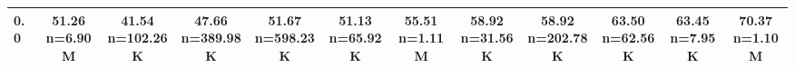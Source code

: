 \begin{table}
\begin{tabular}{lccccccccccc}
0.0 & \makecell{51.26 \\ \scriptsize n=6.90M} & \makecell{41.54 \\ \scriptsize n=102.26K} & \makecell{47.66 \\ \scriptsize n=389.98K} & \makecell{51.67 \\ \scriptsize n=598.23K} & \makecell{51.13 \\ \scriptsize n=65.92K} & \makecell{55.51 \\ \scriptsize n=1.11M} & \makecell{58.92 \\ \scriptsize n=31.56K} & \makecell{58.92 \\ \scriptsize n=202.78K} & \makecell{63.50 \\ \scriptsize n=62.56K} & \makecell{63.45 \\ \scriptsize n=7.95K} & \makecell{70.37 \\ \scriptsize n=1.10M} \\
            \bottomrule
            \end{tabular}
            \label{tab:si-disruption-matrix-1}
            \end{table}